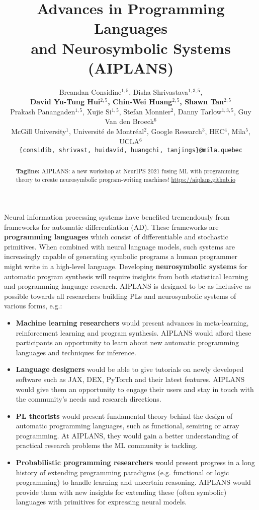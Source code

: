 \documentclass{article}
\title{Advances in Programming Languages\\ and Neurosymbolic Systems (AIPLANS)}
\author{%
    Breandan Considine$^{1, 5}$, Disha Shrivastava$^{1, 3, 5}$, \\\textbf{David Yu-Tung Hui$^{2, 5}$, Chin-Wei Huang$^{2, 5}$, Shawn Tan$^{2, 5}$} \\
    Prakash Panangaden$^{1, 5}$, Xujie Si$^{1, 5}$, Stefan Monnier$^{2}$, Danny Tarlow$^{1, 3, 5}$, Guy Van den Broeck$^6$\\
    McGill University$^1$, Universit\'e de Montr\'eal$^2$, Google Research$^3$, HEC$^4$, Mila$^5$, UCLA$^6$ \\
    \texttt{\{considib, shrivast, huidavid, huangchi, tanjings\}@mila.quebec} \\
}
\begin{document}
    \maketitle
    \vspace{-0.5cm}
    \begin{abstract}
        \textbf{Tagline:} AIPLANS: a new workshop at NeurIPS 2021 fusing ML with programming theory to create neurosymbolic program-writing machines!  \url{https://aiplans.github.io} %
    \end{abstract}


    Neural information processing systems have benefited tremendously from frameworks for automatic differentiation (AD). These frameworks are \textbf{programming languages} which consist of differentiable and stochastic primitives. When combined with neural language models, such systems are increasingly capable of generating symbolic programs a human programmer might write in a high-level language. Developing \textbf{neurosymbolic systems} for automatic program synthesis will require insights from both statistical learning and programming language research. AIPLANS is designed to be as inclusive as possible towards all researchers building PLs and neurosymbolic systems of various forms, e.g.:
    \begin{itemize}
        \item \textbf{Machine learning researchers} would present advances in meta-learning, reinforcement learning and program synthesis. AIPLANS would afford these participants an opportunity to learn about new automatic programming languages and techniques for inference.
        \item \textbf{Language designers} would be able to give tutorials on newly developed software such as JAX, DEX, PyTorch and their latest features. AIPLANS would give them an opportunity to engage their users and stay in touch with the community's needs and research directions.
        \item \textbf{PL theorists} would present fundamental theory behind the design of automatic programming languages, such as functional, semiring or array programming. At AIPLANS, they would gain a better understanding of practical research problems the ML community is tackling.
        \item \textbf{Probabilistic programming researchers} would present progress in a long history of extending programming paradigms (e.g. functional or logic programming) to handle learning and uncertain reasoning. AIPLANS would provide them with new insights for extending these (often symbolic) languages with primitives for expressing neural models.
    \end{itemize}
\end{document}
